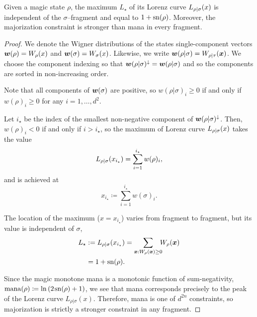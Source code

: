 \documentclass[pra,
aps,
twocolumn,
superscriptaddress,
groupedaddress,
nofootinbib,
reprint
]{revtex4-1}
\begin{document}
\begingroup
\def\thetheorem{\ref{lem:lcmax}}
\begin{theorem}
	Given a magic state $\rho$, the maximum $L_\star$ of its Lorenz curve ${L_{\rho|\sigma}}(x)$ is independent of the $\sigma$--fragment and equal to $1+{{\rm{sn}}(\rho)}$. Moreover, the majorization constraint is stronger than mana in every fragment.
\end{theorem}
\addtocounter{theorem}{-1}
\endgroup
\begin{proof}
	We denote the Wigner distributions of the states single-component vectors $\boldsymbol{w}(\rho)=W_\rho(x)$ and $ \boldsymbol{w}(\sigma)=W_\sigma(x)$. Likewise, we write $\boldsymbol{w}(\rho|\sigma) = W_{\rho|\tau}(\boldsymbol{x})$.
	We choose the component indexing so that $\boldsymbol{w}(\rho|\sigma)^\downarrow = \boldsymbol{w}(\rho|\sigma)$ and so the components are sorted in non-increasing order.

Note that all components of $\bm{w}(\sigma)$ are positive, so $w(\rho|\sigma)_i \geq 0$ if and only if $w(\rho)_i \geq 0$ for any $i=1,\dots,d^2$.
	
	Let $i_\star$ be the index of the smallest non-negative component of $\boldsymbol{w}(\rho|\sigma)^\downarrow$.
	Then, $w(\rho)_i < 0$ if and only if $i > i_\star$, so the maximum of Lorenz curve ${L_{\rho|\sigma}}(x)$ takes the value 
	\begin{equation}
		{L_{\rho|\sigma}}(x_{i_\star}) = \sum_{i=1}^{i_\star} w(\rho)_i,
	\end{equation}
	and is achieved at
	\begin{equation}\label{eq:maxloc}
		x_{i_\star} \coloneqq \sum_{i=1}^{i_\star} w(\sigma)_i.
	\end{equation}

	The location of the maximum ($x=x_{i_\star}$) varies from fragment to fragment, but its value is independent of $\sigma$,
	\begin{align}
	L_\star &:=	\lc{\rho}{\sigma}(x_{i_\star}) 
		= \sum\limits_{\bmx: \W[\bmx]{\rho} \geq 0}\hspace{-5pt} \W[\bmx]{\rho} \nonumber \\
		&= 1 + \sn{\rho}.
	\end{align}
	
Since the magic monotone mana is a monotonic function of sum-negativity, $\rm{mana}(\rho) \coloneqq \ln{(2\hspace{1pt} {{\rm{sn}}(\rho)} +1)}$, we see that mana corresponds precisely to the peak of the Lorenz curve $L_{\rho|\sigma}(x)$. Therefore, mana is one of $d^{2n}$ constraints, so majorization is strictly a stronger constraint in any fragment.
\end{proof}
\end{document}
